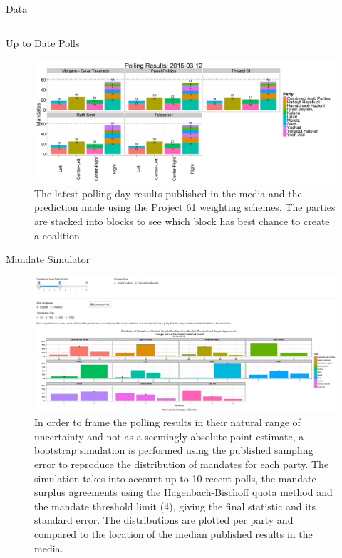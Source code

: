\documentclass[final, hyperref={pdfpagelabels=false}]{beamer}
\begin{document}
\begin{frame}{}
\begin{columns}[t]
\begin{column}{.3\linewidth}
\begin{block}{Data}
			\end{block}
		\end{column}
	\end{columns}
	\begin{columns}[t]		
		\begin{column}{.45\linewidth}
			\begin{block}{Up to Date Polls}
				\begin{figure}[h]
				\centering
				\includegraphics[width=1\linewidth]{../www/LastDayPlot}
				\caption{The latest polling day results published in the media and the prediction made using the Project 61 weighting schemes. The parties are stacked into blocks to see which block has best chance to create a coalition.}
				\label{fig:LastDayPlot}
				\end{figure}
			\end{block}

			\begin{block}{Mandate Simulator}
				\begin{figure}[h]
					\centering
					\includegraphics[width=.9\linewidth]{../www/sim_screen_grab}
					\caption{In order to frame the polling results in their natural range of uncertainty and not as a seemingly absolute point estimate, a bootstrap simulation is performed using the published sampling error to reproduce the distribution of mandates for each party. The simulation takes into account up to 10 recent polls, the mandate surplus agreements using the Hagenbach-Bischoff quota method and the mandate threshold limit (4), giving the final statistic and its standard error. The distributions are plotted per party and compared to the location of the median published results in the media.}
					\label{fig:sim_screen_grab}
				\end{figure}				
			\end{block}
			

\end{column}
\end{columns}
\end{frame}
\end{document}
